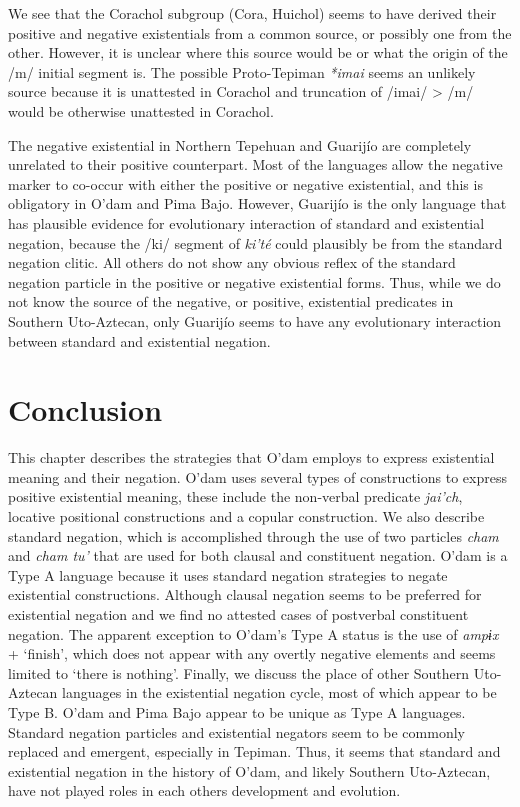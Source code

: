 \documentclass[output=paper]{langsci/langscibook}
\begin{document}
We see that the Corachol subgroup (Cora, Huichol) seems to have derived their positive and negative existentials from a common source, or possibly one from the other. However, it is unclear where this source would be or what the origin of the /m/ initial segment is. The possible Proto-Tepiman \emph{*imai} seems an unlikely source because it is unattested in Corachol and truncation of /imai/ > /m/ would be otherwise unattested in Corachol. 

The negative existential in Northern Tepehuan and Guarijío are completely unrelated to their positive counterpart. Most of the languages allow the negative marker to co-occur with either the positive or negative existential, and this is obligatory in O'dam and Pima Bajo. However, Guarijío is the only language that has plausible evidence for evolutionary interaction of standard and existential negation, because the /ki/ segment of \emph{ki'té} could plausibly be from the standard negation clitic. All others do not show any obvious reflex of the standard negation particle in the positive or negative existential forms. Thus, while we do not know the source of the negative, or positive, existential predicates in Southern Uto-Aztecan, only Guarijío seems to have any evolutionary interaction between standard and existential negation.

\section{Conclusion}
This chapter describes the strategies that O’dam employs to express existential meaning and their negation. O’dam uses several types of constructions to express positive existential meaning, these include the non-verbal predicate \emph{jai’ch}, locative positional constructions and a copular construction. We also describe standard negation, which is accomplished through the use of two particles \emph{cham} and \emph{cham tu’} that are used for both clausal and constituent negation. O’dam is a Type A language because it uses standard negation strategies to negate existential constructions. Although clausal negation seems to be preferred for existential negation and we find no attested cases of postverbal constituent negation. The apparent exception to O’dam’s Type A status is the use of \emph{ampɨx} + ‘finish’, which does not appear with any overtly negative elements and seems limited to ‘there is nothing’. Finally, we discuss the place of other Southern Uto-Aztecan languages in the existential negation cycle, most of which appear to be Type B. O’dam and Pima Bajo appear to be unique as Type A languages. Standard negation particles and existential negators seem to be commonly replaced and emergent, especially in Tepiman. Thus, it seems that standard and existential negation in the history of O'dam, and likely Southern Uto-Aztecan, have not played roles in each others development and evolution.
\clearpage
\end{document}
